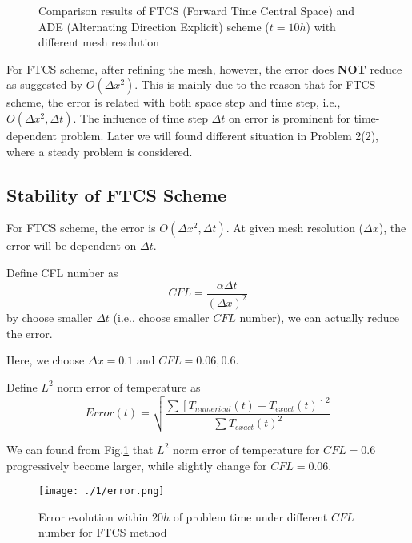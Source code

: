 \documentclass[12pt,a4paper]{article} %
\begin{document}
\begin{CJK}{UTF8}{song}
\begin{figure}[htbp]
\centering
{}
\caption{Comparison results of FTCS (Forward Time Central Space) and ADE (Alternating Direction Explicit) scheme ($t=10h$) with different mesh resolution}
\end{figure}


For FTCS scheme, after refining the mesh, however, the error does \textbf{NOT} reduce as suggested by $O(\Delta x^{2})$.
This is mainly due to the reason that for FTCS scheme,
the error is related with both space step and time step, i.e., $O(\Delta x^{2},\Delta t)$.
The influence of time step $\Delta t$ on error is prominent for time-dependent problem.
Later we will found different situation in Problem 2(2), where a steady problem is considered.

\subsection{Stability of FTCS Scheme}
For FTCS scheme, the error is $O(\Delta x^{2},\Delta t)$. At given mesh resolution ($\Delta x$), the error will be dependent on $\Delta t$.

Define CFL number as
\begin{equation}
CFL=\frac{\alpha \Delta t}{(\Delta x)^{2}}
\end{equation}
by choose smaller $\Delta t$ (i.e., choose smaller $CFL$ number), we can actually reduce the error.

Here, we choose $\Delta x=0.1$ and $CFL=0.06, 0.6$.

Define $L^{2}$ norm error of temperature as
\begin{equation}
Error(t)=\sqrt{\frac{\sum[T_{numerical}(t)-T_{exact}(t)]^{2}}{\sum T_{exact}(t)^{2}}}
\end{equation}

We can found from Fig.\ref{Fig.1-error} that $L^{2}$ norm error of temperature for $CFL=0.6$ progressively become larger,
while slightly change for $CFL=0.06$.

\begin{figure}[htbp]
\centering
\texttt{[image: ./1/error.png]}
\caption{Error evolution within $20h$ of problem time under different $CFL$ number for FTCS method} \label{Fig.1-error}
\end{figure}


\end{CJK}
\end{document}
